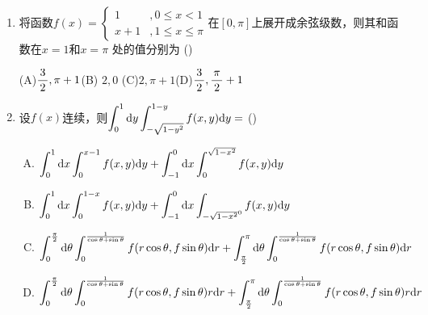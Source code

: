 \begin{enumerate}
  (A)$\df34$\hspace{1cm}(B)$\df12$\hspace{1cm}
  (C)$-\df34$\hspace{1cm}(D)$-\df12$
  \item 将函数$f(x)=\left\{\begin{array}{ll}
  1&,0\leq x<1\\ x+1&,1\leq x\leq \pi
  \end{array}\right.$在$[0,\pi]$上展开成余弦级数，则其和函数在$x=1$和$x=\pi$
  处的值分别为
  (\underline{\hspace{1cm}})
  
  (A)$\displaystyle\frac{\,{3}\,}{\,{2}\,},\pi+1$\hspace{1cm}(B) $2,0$\hspace{1cm}
  (C)$2,\pi+1$\hspace{1cm}(D)$\displaystyle\frac{\,{3}\,}{\,{2}\,},\displaystyle\frac{\,{\pi}\,}{\,{2}\,}+1$
  \item 设$f(x)$连续，则$\displaystyle\int_0^1\mathrm{d} y\displaystyle\int_{-\sqrt{1-y^2}}^{1-y}f(x,y)\mathrm{d} y=$
  (\underline{\hspace{1cm}})
  \begin{enumerate}[(A)]
    \item $\displaystyle\int_0^1\mathrm{d} x\displaystyle\int_{0}^{x-1}f(x,y)\mathrm{d} y
    +\displaystyle\int_{-1}^0\mathrm{d} x\displaystyle\int_0^{\sqrt{1-x^2}}f(x,y)\mathrm{d} y$
    \item $\displaystyle\int_0^1\mathrm{d} x\displaystyle\int_{0}^{1-x}f(x,y)\mathrm{d} y
    +\displaystyle\int_{-1}^0\mathrm{d} x\displaystyle\int_{-\sqrt{1-x^2}^0}f(x,y)\mathrm{d} y$
    \item $\displaystyle\int_0^{\frac{\pi}2}\mathrm{d}\theta\displaystyle\int_0^{\frac1{\cos\theta+\sin\theta}}
    f(r\cos\theta,f\sin\theta)\mathrm{d} r+\displaystyle\int_{\frac{\pi}2}^{\pi}\mathrm{d}\theta
    \displaystyle\int_0^{\frac1{\cos\theta+\sin\theta}}f(r\cos\theta,f\sin\theta)\mathrm{d} r$
    \item $\displaystyle\int_0^{\frac{\pi}2}\mathrm{d}\theta\displaystyle\int_0^{\frac1{\cos\theta+\sin\theta}}
    f(r\cos\theta,f\sin\theta)r\mathrm{d} r+\displaystyle\int_{\frac{\pi}2}^{\pi}\mathrm{d}\theta
    \displaystyle\int_0^{\frac1{\cos\theta+\sin\theta}}f(r\cos\theta,f\sin\theta)r\mathrm{d} r$
  \end{enumerate}
  
\end{enumerate}